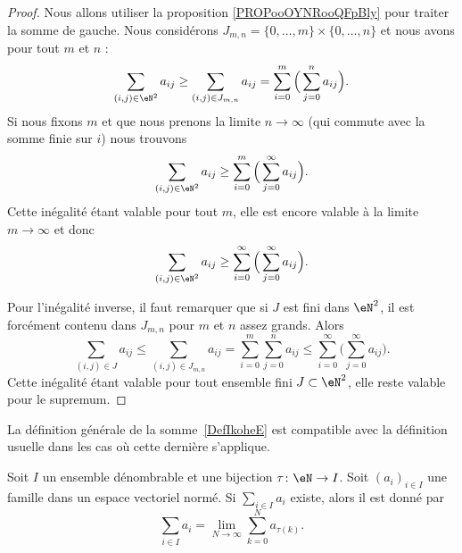 \begin{proof}
    Nous allons utiliser la proposition \ref{PROPooOYNRooQFpBly} pour traiter la somme de gauche. Nous considérons \( J_{m,n}=\{ 0,\ldots, m \}\times \{ 0,\ldots, n \}\) et nous avons pour tout \( m\) et \( n\) :
	\begin{equation}
		\sum_{(i,j)\in \eN^2}a_{ij}\geq \sum_{(i,j)\in J_{m,n}}a_{ij}=\sum_{i=0}^m\Big( \sum_{j=0}^na_{ij} \Big).
	\end{equation}
	Si nous fixons \( m\) et que nous prenons la limite \( n\to \infty\) (qui commute avec la somme finie sur \( i\)) nous trouvons
	\begin{equation}
		\sum_{(i,j)\in \eN^2}a_{ij}\geq \sum_{i=0}^m\Big( \sum_{j=0}^{\infty}a_{ij} \Big).
	\end{equation}
	Cette inégalité étant valable pour tout \( m\), elle est encore valable à la limite \( m\to \infty\) et donc
	\begin{equation}
		\sum_{(i,j)\in \eN^2}a_{ij}\geq \sum_{i=0}^{\infty}\Big( \sum_{j=0}^{\infty}a_{ij} \Big).
	\end{equation}

	Pour l'inégalité inverse, il faut remarquer que si \( J\) est fini dans \( \eN^2\), il est forcément contenu dans \( J_{m,n}\) pour \( m\) et \( n\) assez grands. Alors
	\begin{equation}
		\sum_{(i,j)\in J}a_{ij}\leq \sum_{(i,j)\in J_{m,n}}a_{ij}=\sum_{i=0}^m\sum_{j=0}^na_{ij}\leq \sum_{i=0}^{\infty}\Big( \sum_{j=0}^{\infty}a_{ij} \Big).
	\end{equation}
	Cette inégalité étant valable pour tout ensemble fini \( J\subset \eN^2\), elle reste valable pour le supremum.
\end{proof}

La définition générale de la somme~\ref{DefIkoheE} est compatible avec la définition usuelle dans les cas où cette dernière s'applique.
\begin{proposition}\label{PropoWHdjw}
	Soit \( I\) un ensemble dénombrable et une bijection \( \tau\colon \eN\to I\). Soit \( (a_i)_{i\in I}\) une famille dans un espace vectoriel normé.  Si \( \sum_{i\in I}a_i\) existe, alors il est donné par
	\begin{equation}
		\sum_{i\in I}a_i=\lim_{N\to \infty} \sum_{k=0}^Na_{\tau(k)}.
	\end{equation}
\end{proposition}


